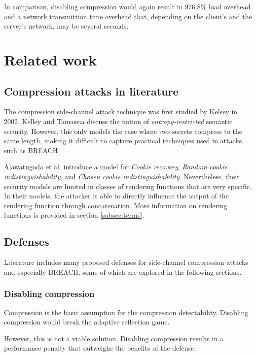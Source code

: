 \documentclass[conference, letterpaper, 10pt]{IEEEtran}
\begin{document}
In comparison, disabling compression would again result in 976.8\% load overhead
and a network transmittion time overhead that, depending on the client's and the
server's network, may be several seconds.

\section{Related work}\label{sec:related}

\subsection{Compression attacks in literature}

The compression side-channel attack technique was first studied by Kelsey
\cite{c12} in 2002.
Kelley and Tamassia\cite{c13} discuss the notion of \textit{entropy-restricted} semantic
security. However, this only models the case where two secrets compress to the same
length, making it difficult to capture practical techniques used in attacks
such as BREACH.

Alawatugoda et al. \cite{c14} introduce a model for \textit{Cookie recovery},
\textit{Random cookie indistinguishability}, and \textit{Chosen cookie indistinguishability}.
Nevertheless, their security models are limited in classes of rendering functions
that are very specific. In their models, the attacker is able to directly influence
the output of the rendering function through concatenation. More information on
rendering functions is provided in section \ref{subsec:terms}.

\subsection{Defenses}

Literature includes many proposed defenses for side-channel compression attacks
and especially BREACH, some of which are explored in the following sections.

\subsubsection{Disabling compression}\label{subsec:disablecom}
Compression is the basic assumption for the compression detectability. Disabling
compression would break the adaptive reflection game.

However, this is not a viable solution. Disabling compression results in a
performance penalty that outweighs the benefits of the defense.
\end{document}
